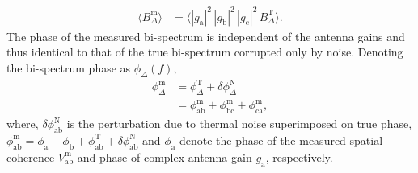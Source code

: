 \documentclass[
reprint,
superscriptaddress,
amsmath,
amssymb,
aps,
prd
]{revtex4-1}
\begin{document}
\begin{align}
  \langle B_\Delta^\textrm{m}\rangle &= \langle |g_\textrm{a}|^2\, |g_\textrm{b}|^2\, |g_\textrm{c}|^2\, B_\Delta^\textrm{T}\rangle. \label{eqn:closure-asymptotic}
\end{align}
The phase of the measured bi-spectrum is independent of the antenna gains and thus identical to that of the true bi-spectrum corrupted only by noise. Denoting the bi-spectrum phase as $\phi_\Delta(f)$, 
\begin{align}
  \phi_\Delta^\textrm{m} &= \phi_\Delta^\textrm{T} + \delta\phi_\Delta^\textrm{N} \label{eqn:cpphase-sum-sky-noise} \\
  &= \phi_\textrm{ab}^\textrm{m} + \phi_\textrm{bc}^\textrm{m} + \phi_\textrm{ca}^\textrm{m} \label{eqn:cpphase-sum-of-visphases},
\end{align}
where, $\delta\phi_\textrm{ab}^\textrm{N}$ is the perturbation due to thermal noise superimposed on true phase, $\phi_\textrm{ab}^\textrm{m} = \phi_\textrm{a} - \phi_\textrm{b} + \phi_\textrm{ab}^\textrm{T} + \delta\phi_\textrm{ab}^\textrm{N}$ and $\phi_\textrm{a}$ denote the phase of the measured spatial coherence $V_\textrm{ab}^\textrm{m}$ and phase of complex antenna gain $g_\textrm{a}$, respectively. 
\end{document}

